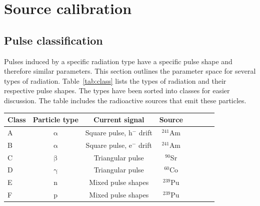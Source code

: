 \section{Source calibration}
\label{sec:sourcecalib}

\subsection{Pulse classification}
\label{sec:radclass}

Pulses induced by a specific radiation type have a specific pulse shape and therefore similar parameters. This section outlines the parameter space for several types of radiation. Table~\ref{tab:class} lists the types of radiation and their respective pulse shapes. The  types have been sorted into classes for easier discussion. The table includes the radioactive sources that emit these particles. 

\begin{footnotesize}
\begin{center}
\begin{tabular}{l c c c c c c c}
\hline
Class & Particle type & Current signal & Source   \\
\hline
A & $\upalpha$        & Square pulse, h$^-$ drift & $^{241}$Am  \\
B & $\upalpha$        & Square pulse, e$^-$ drift & $^{241}$Am   \\
C & $\upbeta$         & Triangular pulse               & $^{90}$Sr  \\
D & $\upgamma$    & Triangular pulse               & $^{60}$Co   \\
E & n                       &  Mixed pulse shapes        & $^{239}$Pu  \\
F & p                       & Mixed pulse shapes         & $^{239}$Pu  \\ 
\hline
\end{tabular}
\label{tab:class}
\end{center}
\end{footnotesize}



